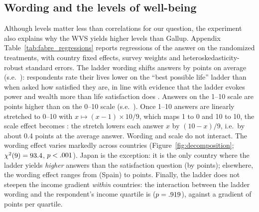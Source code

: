 \documentclass[12pt]{article}
\begin{document}
\subsection{Wording and the levels of well-being}\label{subsec:experiment}

Although levels matter less than correlations for our question, the experiment also explains why the WVS yields higher levels than Gallup. Appendix Table~\ref{tab:fabre_regressions} reports regressions of the answer on the randomized treatments, with country fixed effects, survey weights and heteroskedasticity-robust standard errors. The ladder wording shifts answers by \effectLadder points on average (s.e.\ \seLadder): respondents rate their lives lower on the ``best possible life'' ladder than when asked how satisfied they are, in line with evidence that the ladder evokes power and wealth more than life satisfaction does \citep{nilsson_cantril_2024}. Answers on the 1--10 scale are \effectScale points higher than on the 0--10 scale (s.e.\ \seScale). Once 1--10 answers are linearly stretched to 0--10 with $x \mapsto (x-1) \times 10/9$, which maps 1 to 0 and 10 to 10, the scale effect becomes \effectScaleZeroTen: the stretch lowers each answer $x$ by $(10-x)/9$, i.e.\ by about 0.4 points at the average answer. Wording and scale do not interact. The wording effect varies markedly across countries (Figure~\ref{fig:decomposition}; $\chi^2(9) = 93.4$, $p < .001$). Japan is the exception: it is the only country where the ladder yields \textit{higher} answers than the satisfaction question (by \wordingJPN points); elsewhere, the wording effect ranges from \wordingMin (Spain) to \wordingMaxNegative points. Finally, the ladder does not steepen the income gradient \textit{within} countries: the interaction between the ladder wording and the respondent's income quartile is \interactionLadderIncome ($p = .919$), against a gradient of \gradientIncomeSatisfaction points per quartile.
\end{document}
